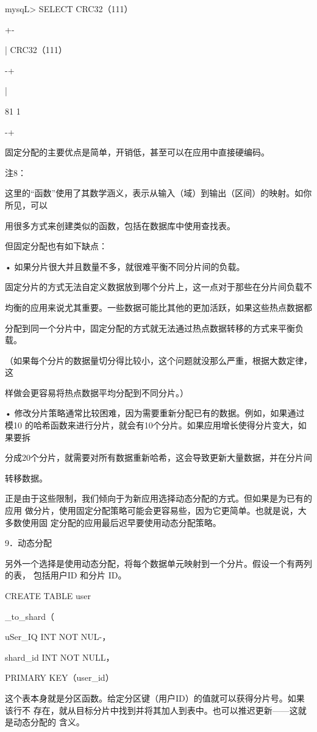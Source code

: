 mysqL> SELECT CRC32（111） %

+-

| CRC32（111） %

-+

|

81 1

-+

固定分配的主要优点是简单，开销低，甚至可以在应用中直接硬编码。

注8：

这里的“函数”使用了其数学涵义，表示从输入（域）到输出（区间）的映射。如你所见，可以

用很多方式来创建类似的函数，包括在数据库中使用查找表。

但固定分配也有如下缺点：

• 如果分片很大并且数量不多，就很难平衡不同分片间的负载。

固定分片的方式无法自定义数据放到哪个分片上，这一点对于那些在分片间负载不

均衡的应用来说尤其重要。一些数据可能比其他的更加活跃，如果这些热点数据都

分配到同一个分片中，固定分配的方式就无法通过热点数据转移的方式来平衡负载。

（如果每个分片的数据量切分得比较小，这个问题就没那么严重，根据大数定律，这

样做会更容易将热点数据平均分配到不同分片。）

• 修改分片策略通常比较困难，因为需要重新分配已有的数据。例如，如果通过模10
的哈希函数来进行分片，就会有10个分片。如果应用增长使得分片变大，如果要拆

分成20个分片，就需要对所有数据重新哈希，这会导致更新大量数据，并在分片间

转移数据。

正是由于这些限制，我们倾向于为新应用选择动态分配的方式。但如果是为已有的应用
做分片，使用固定分配策略可能会更容易些，因为它更简单。也就是说，大多数使用固
定分配的应用最后迟早要使用动态分配策略。

9．动态分配

另外一个选择是使用动态分配，将每个数据单元映射到一个分片。假设一个有两列的表，
包括用户ID 和分片 ID。

CREATE TABLE user

\_to\_shard（

uSer\_IQ INT NOT NUL-，

shard\_id INT NOT NULL，

PRIMARY KEY（user\_id）

这个表本身就是分区函数。给定分区键（用户ID）的值就可以获得分片号。如果该行不
存在，就从目标分片中找到并将其加人到表中。也可以推迟更新——这就是动态分配的
含义。

